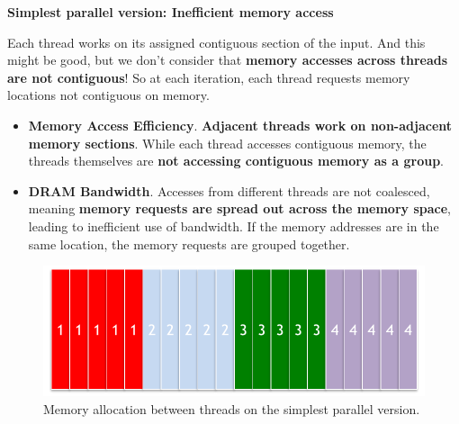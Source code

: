 \begin{itemize}
    \newpage
    \begin{flushleft}
        \textcolor{Red2}{ \textbf{Simplest parallel version: Inefficient memory access}}
    \end{flushleft}
    Each thread works on its assigned contiguous section of the input. And this might be good, but we don't consider that \textbf{memory accesses across threads are not contiguous}! So at each iteration, each thread requests memory locations not contiguous on memory.
    \begin{itemize}[label=\textcolor{Red2}{}]
        \item \textcolor{Red2}{\textbf{Memory Access Efficiency}}. \textbf{Adjacent threads work on non-adjacent memory sections}. While each thread accesses contiguous memory, the threads themselves are \textbf{not accessing contiguous memory as a group}.
        \item \textcolor{Red2}{\textbf{DRAM Bandwidth}}. Accesses from different threads are not coalesced, meaning \textbf{memory requests are spread out across the memory space}, leading to inefficient use of bandwidth. If the memory addresses are in the same location, the memory requests are grouped together.
    \end{itemize}
    \begin{figure}[!htp]
        \centering
        \includegraphics[width=.6\textwidth]{img/histogram-pattern-2.pdf}
        \caption{Memory allocation between threads on the simplest parallel version.}
        \label{fig: Memory allocation between threads on the simplest parallel version}
    \end{figure}


\end{itemize}
